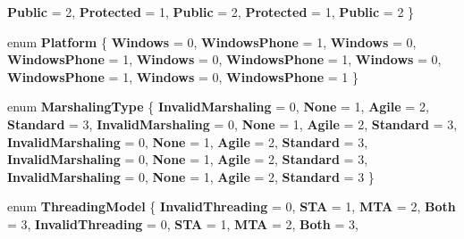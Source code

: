 \begin{DoxyCompactItemize}
{\bfseries Public} = 2, 
{\bfseries Protected} = 1, 
{\bfseries Public} = 2, 
\newline
{\bfseries Protected} = 1, 
{\bfseries Public} = 2
 \}
\item 
\mbox{\label{namespace_windows_1_1_foundation_1_1_metadata_ac74fec362ca55a3b5379960a1fde476d}} 
enum {\bfseries Platform} \{ \newline
{\bfseries Windows} = 0, 
{\bfseries Windows\+Phone} = 1, 
{\bfseries Windows} = 0, 
{\bfseries Windows\+Phone} = 1, 
\newline
{\bfseries Windows} = 0, 
{\bfseries Windows\+Phone} = 1, 
{\bfseries Windows} = 0, 
{\bfseries Windows\+Phone} = 1, 
\newline
{\bfseries Windows} = 0, 
{\bfseries Windows\+Phone} = 1
 \}
\item 
\mbox{\label{namespace_windows_1_1_foundation_1_1_metadata_af96a9466daa74933d167e8e5777f203f}} 
enum {\bfseries Marshaling\+Type} \{ \newline
{\bfseries Invalid\+Marshaling} = 0, 
{\bfseries None} = 1, 
{\bfseries Agile} = 2, 
{\bfseries Standard} = 3, 
\newline
{\bfseries Invalid\+Marshaling} = 0, 
{\bfseries None} = 1, 
{\bfseries Agile} = 2, 
{\bfseries Standard} = 3, 
\newline
{\bfseries Invalid\+Marshaling} = 0, 
{\bfseries None} = 1, 
{\bfseries Agile} = 2, 
{\bfseries Standard} = 3, 
\newline
{\bfseries Invalid\+Marshaling} = 0, 
{\bfseries None} = 1, 
{\bfseries Agile} = 2, 
{\bfseries Standard} = 3, 
\newline
{\bfseries Invalid\+Marshaling} = 0, 
{\bfseries None} = 1, 
{\bfseries Agile} = 2, 
{\bfseries Standard} = 3
 \}
\item 
\mbox{\label{namespace_windows_1_1_foundation_1_1_metadata_a4b7486fa60d9faccd8b65757f42b1aa1}} 
enum {\bfseries Threading\+Model} \{ \newline
{\bfseries Invalid\+Threading} = 0, 
{\bfseries S\+TA} = 1, 
{\bfseries M\+TA} = 2, 
{\bfseries Both} = 3, 
\newline
{\bfseries Invalid\+Threading} = 0, 
{\bfseries S\+TA} = 1, 
{\bfseries M\+TA} = 2, 
{\bfseries Both} = 3, 
\newline

\end{DoxyCompactItemize}
